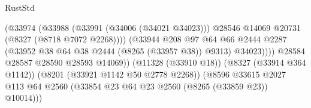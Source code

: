 \begin{lexlean}{RustStd}
\begin{coremodule}
{\begin{coremodule}
{{{{{{{{{{{{{{{{{{{{{{{{{{{{{{{{{{{{{{{{{{{{{{{{{{{{{{                                                      (@33974
                                                        (@33988
                                                          (@33991 (@34006 (@34021 @34023)))
                                                          @28546
                                                          @14069
                                                          @20731
                                                          (@8327 (@8718 @7072 @2268))))
                                                      (@33944
                                                        @208
                                                        @97
                                                        @64
                                                        @66
                                                        @2444
                                                        @2287
                                                        (@33952
                                                          @38
                                                          @64
                                                          @38
                                                          @2444
                                                          (@8265 (@33957 @38))
                                                          @9313)
                                                        @34023))))
                                                @28584
                                                @28587
                                                @28590
                                                @28593
                                                @14069))
                                            (@11328 (@33910 @18))
                                            (@8327 (@33914 @364 @1142))
                                            (@8201 (@33921 @1142 @50 @2778 @2268))
                                            (@8596
                                              @33615
                                              @2027
                                              @113
                                              @64
                                              @2560
                                              (@33854
                                                @23
                                                @64
                                                @23
                                                @2560
                                                (@8265 (@33859 @23))
                                                @10014)))
}}}}}}}}}}}}}}}}}}}}}}}}}}}}}}}}}}}}}}}}}}}}}}}}}}}}}}
\end{coremodule}}
\end{coremodule}
\end{lexlean}
